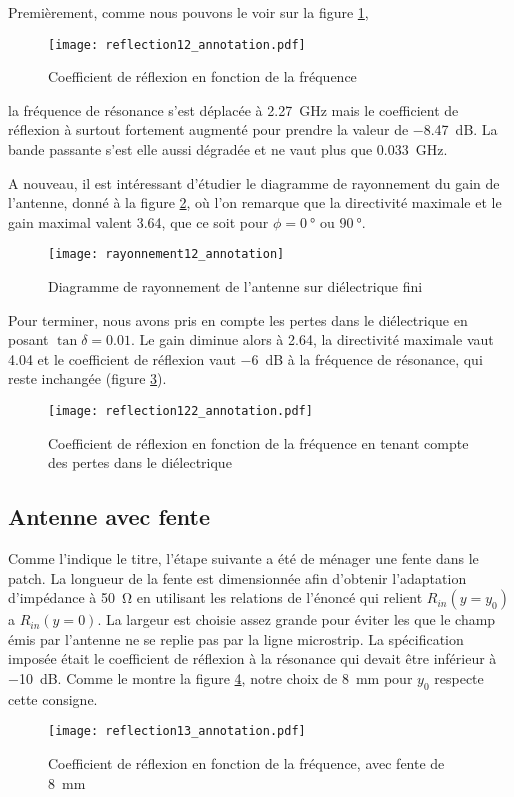 Premièrement, comme nous pouvons le voir sur la figure \ref{fig:reflection12_annotation},
\begin{figure}[htbp]
\centering
\texttt{[image: reflection12\_annotation.pdf]}
\caption{Coefficient de réflexion en fonction de la fréquence\label{fig:reflection12_annotation}}
\end{figure}
la fréquence de résonance s'est déplacée à \SI{2.27}{\giga\hertz} mais le coefficient de réflexion à surtout fortement augmenté pour prendre la valeur de \SI{-8.47}{\deci\bel}. La bande passante s'est elle aussi dégradée et ne vaut plus que \SI{0.033}{\giga\hertz}.

A nouveau, il est intéressant d'étudier le diagramme de rayonnement du gain de l'antenne, donné à la figure \ref{fig:rayonnement12_annotation}, où l'on remarque que la directivité maximale et le gain maximal valent \SI{3.64}{},	 que ce soit pour $\phi = \SI{0}{\degree}$ ou $\SI{90}{\degree}$.
\begin{figure}
\centering
\texttt{[image: rayonnement12\_annotation]}
\caption{Diagramme de rayonnement de l'antenne sur diélectrique fini}
\label{fig:rayonnement12_annotation}
\end{figure}
Pour terminer, nous avons pris en compte les pertes dans le diélectrique en posant $\tan{\delta} = 0.01$. Le gain diminue alors à \num{2.64}, la directivité maximale vaut \SI{4.04}{} et le coefficient de réflexion vaut \SI{-6}{\deci\bel} à la fréquence de résonance, qui reste inchangée (figure \ref{fig:reflection122_annotation}).
\begin{figure}[htbp]
\centering
\texttt{[image: reflection122\_annotation.pdf]}
\caption{Coefficient de réflexion en fonction de la fréquence en tenant compte des pertes dans le diélectrique}
\label{fig:reflection122_annotation}
\end{figure}


\subsection{Antenne avec fente}
Comme l'indique le titre, l'étape suivante a été de ménager une fente dans le patch. La longueur de la fente est dimensionnée afin d'obtenir l'adaptation d'impédance à \SI{50}{\ohm} en utilisant les relations de l'énoncé qui relient $R_{in}(y=y_0)$ a $R_{in} (y= 0)$. La largeur est choisie assez grande pour éviter les que le champ émis par l'antenne ne se replie pas par la ligne microstrip. La spécification imposée était le coefficient de réflexion à la résonance qui devait être inférieur à \SI{-10}{\deci\bel}. Comme le montre la figure \ref{fig:reflection13_annotation}, notre choix de \SI{8}{\milli\meter} pour $y_0$ respecte cette consigne.
\begin{figure}[htbp]
\centering
\texttt{[image: reflection13\_annotation.pdf]}
\caption{Coefficient de réflexion en fonction de la fréquence, avec fente de \SI{8}{\milli\meter}}
\label{fig:reflection13_annotation}
\end{figure}

